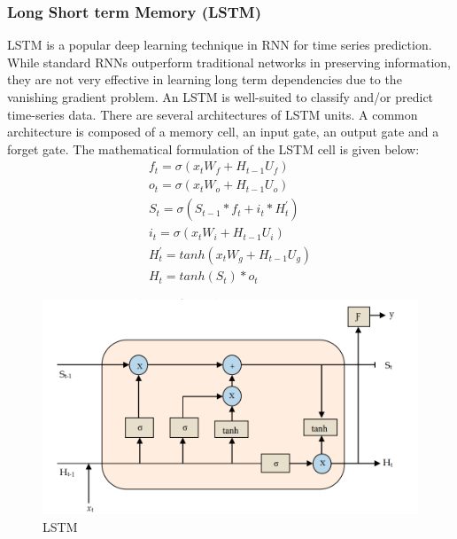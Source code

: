 \subsubsection{Long Short term Memory (LSTM)}
\vspace{-18pt}
LSTM is a popular deep learning technique in RNN for time series prediction. While standard RNNs outperform traditional networks in preserving information, they are not very effective in learning long term dependencies due to the vanishing gradient problem. An LSTM is well-suited to classify and/or predict time-series data. There are several architectures of LSTM units. A common architecture is composed of a memory cell, an input gate, an output gate and a forget gate. The mathematical formulation of the LSTM cell is given below:
\begin{eqnarray}
f_t = \sigma(x_tW_f + H_{t-1}U_f)\\
o_t = \sigma(x_tW_o + H_{t-1}U_o)\\
S_t = \sigma(S_{t-1} *f_t + i_t * H^{'}_t)\\
i_t = \sigma(x_tW_i + H_{t-1}U_i)\\
H^{'}_t = tanh(x_tW_g + H_{t-1}U_g)\\
H_t = tanh(S_t)*o_t
\end{eqnarray}
\begin{figure}[tbh] %
\begin{center}
	\includegraphics[width=6in]{images/l1.png} 
	\caption{LSTM} %
	\label{LSTM} %
\end{center}
\end{figure}
